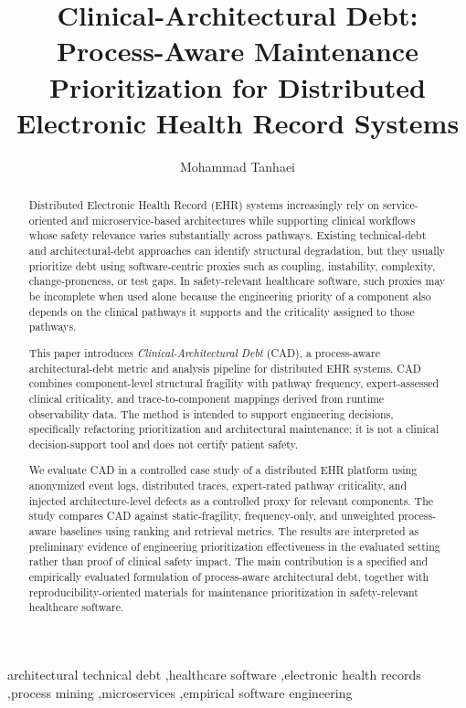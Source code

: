 \documentclass[english,preprint]{elsarticle}
\newcommand{\CAD}{\textsc{CAD}\xspace}
\begin{document}
\begin{frontmatter}

\title{Clinical-Architectural Debt: Process-Aware Maintenance Prioritization for Distributed Electronic Health Record Systems}

\author[ilam]{Mohammad Tanhaei}
\address[ilam]{Department of Engineering, Ilam University, Ilam, Iran}

\begin{abstract}
Distributed Electronic Health Record (EHR) systems increasingly rely on service-oriented and microservice-based architectures while supporting clinical workflows whose safety relevance varies substantially across pathways. Existing technical-debt and architectural-debt approaches can identify structural degradation, but they usually prioritize debt using software-centric proxies such as coupling, instability, complexity, change-proneness, or test gaps. In safety-relevant healthcare software, such proxies may be incomplete when used alone because the engineering priority of a component also depends on the clinical pathways it supports and the criticality assigned to those pathways.

This paper introduces \emph{Clinical-Architectural Debt} (\CAD), a process-aware architectural-debt metric and analysis pipeline for distributed EHR systems. \CAD combines component-level structural fragility with pathway frequency, expert-assessed clinical criticality, and trace-to-component mappings derived from runtime observability data. The method is intended to support engineering decisions, specifically refactoring prioritization and architectural maintenance; it is not a clinical decision-support tool and does not certify patient safety.

We evaluate \CAD in a controlled case study of a distributed EHR platform using anonymized event logs, distributed traces, expert-rated pathway criticality, and injected architecture-level defects as a controlled proxy for relevant components. The study compares \CAD against static-fragility, frequency-only, and unweighted process-aware baselines using ranking and retrieval metrics. The results are interpreted as preliminary evidence of engineering prioritization effectiveness in the evaluated setting rather than proof of clinical safety impact. The main contribution is a specified and empirically evaluated formulation of process-aware architectural debt, together with reproducibility-oriented materials for maintenance prioritization in safety-relevant healthcare software.
\end{abstract}

\begin{keyword}
architectural technical debt \sep healthcare software \sep electronic health records \sep process mining \sep microservices \sep empirical software engineering
\end{keyword}

\end{frontmatter}
\end{document}
